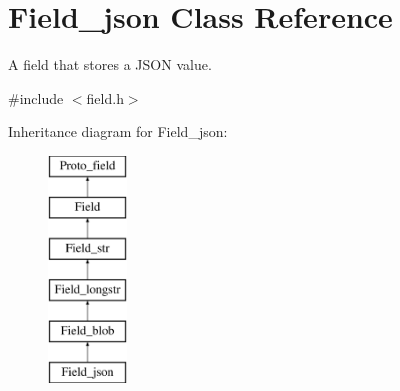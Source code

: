 \hypertarget{classField__json}{}\section{Field\+\_\+json Class Reference}
\label{classField__json}


A field that stores a J\+S\+ON value.  




{\ttfamily \#include $<$field.\+h$>$}

Inheritance diagram for Field\+\_\+json\+:\begin{figure}[H]
\begin{center}
\leavevmode
\includegraphics[height=6.000000cm]{classField__json}
\end{center}
\end{figure}
